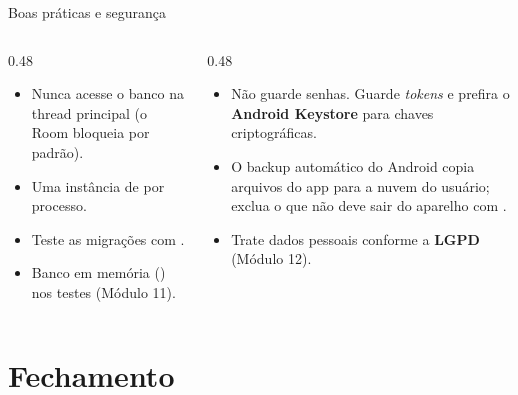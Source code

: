 \documentclass[aspectratio=169,10pt]{beamer}
\begin{document}
\begin{frame}{Boas práticas e segurança}
  \begin{columns}[T]
    \begin{column}{0.48\textwidth}
      \begin{conceito}
        \begin{itemize}
          \item Nunca acesse o banco na thread principal (o Room bloqueia por padrão).
          \item Uma instância de  por processo.
          \item Teste as migrações com .
          \item Banco em memória () nos testes (Módulo 11).
        \end{itemize}
      \end{conceito}
    \end{column}
    \begin{column}{0.48\textwidth}
      \begin{atencao}
        \begin{itemize}
          \item Não guarde senhas. Guarde \emph{tokens} e prefira o \textbf{Android Keystore} para chaves criptográficas.
          \item O backup automático do Android copia arquivos do app para a nuvem do usuário; exclua o que não deve sair do aparelho com .
          \item Trate dados pessoais conforme a \textbf{LGPD} (Módulo 12).
        \end{itemize}
      \end{atencao}
    \end{column}
  \end{columns}
\end{frame}

\section{Fechamento}
\end{document}
